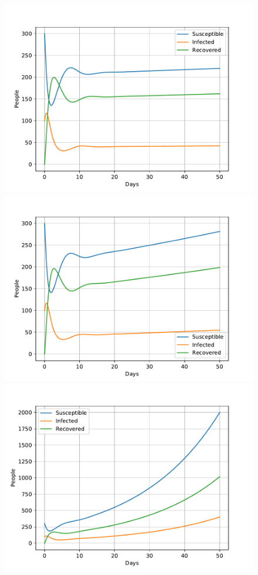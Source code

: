 \documentclass[a4paper]{article}
\begin{document}
\begin{figure}[!htb]
	\centering 
	\includegraphics[scale=0.56]{../plots/opp_c_h_10000.pdf}
	\includegraphics[scale=0.56]{../plots/opp_c_h_20000.pdf}	
	\includegraphics[scale=0.56]{../plots/opp_c_h_100000.pdf}

\end{figure}
\end{document}
